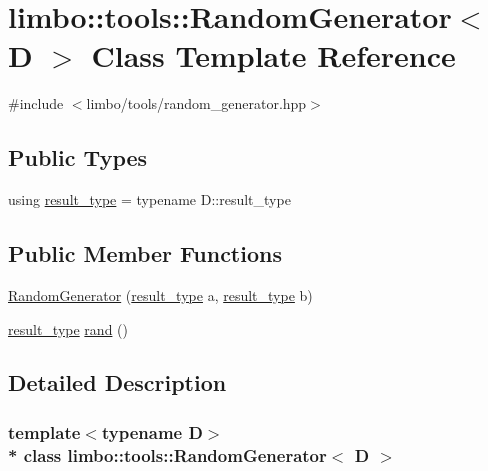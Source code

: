 \hypertarget{classlimbo_1_1tools_1_1_random_generator}{}\section{limbo\+:\+:tools\+:\+:Random\+Generator$<$ D $>$ Class Template Reference}
\label{classlimbo_1_1tools_1_1_random_generator}


{\ttfamily \#include $<$limbo/tools/random\+\_\+generator.\+hpp$>$}

\subsection*{Public Types}
\begin{DoxyCompactItemize}
\item 
using \hyperlink{classlimbo_1_1tools_1_1_random_generator_ae5fdd214eb4fb253cf9f35b9ca7451ba}{result\+\_\+type} = typename D\+::result\+\_\+type
\end{DoxyCompactItemize}
\subsection*{Public Member Functions}
\begin{DoxyCompactItemize}
\item 
\hyperlink{classlimbo_1_1tools_1_1_random_generator_add326a72657fc6034b13c13d1a4e848c}{Random\+Generator} (\hyperlink{classlimbo_1_1tools_1_1_random_generator_ae5fdd214eb4fb253cf9f35b9ca7451ba}{result\+\_\+type} a, \hyperlink{classlimbo_1_1tools_1_1_random_generator_ae5fdd214eb4fb253cf9f35b9ca7451ba}{result\+\_\+type} b)
\item 
\hyperlink{classlimbo_1_1tools_1_1_random_generator_ae5fdd214eb4fb253cf9f35b9ca7451ba}{result\+\_\+type} \hyperlink{classlimbo_1_1tools_1_1_random_generator_a8428af24ab2e4eb744563d12180b6246}{rand} ()
\end{DoxyCompactItemize}


\subsection{Detailed Description}
\subsubsection*{template$<$typename D$>$\\*
class limbo\+::tools\+::\+Random\+Generator$<$ D $>$}

